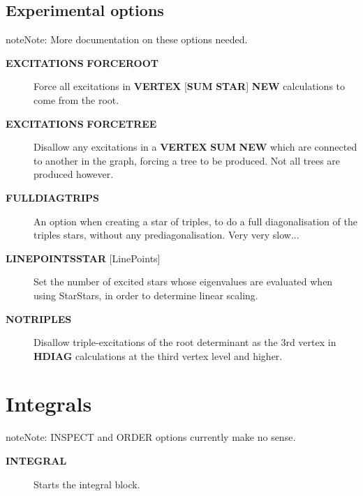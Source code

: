 \documentclass[openany,a4paper,10pt,english]{manual}
\begin{document}
\subsection{Experimental options}

\begin{notice}{note}{Note:}
More documentation on these options needed.
\end{notice}
\begin{description}
\item[\textbf{EXCITATIONS} \textbf{FORCEROOT}] \leavevmode
Force all excitations in \textbf{VERTEX} {[}\textbf{SUM} \textbf{STAR}{]} \textbf{NEW}
calculations to come from the root.

\item[\textbf{EXCITATIONS} \textbf{FORCETREE}] \leavevmode
Disallow any excitations in a \textbf{VERTEX} \textbf{SUM} \textbf{NEW} which are
connected to another in the graph, forcing a tree to be produced.
Not all trees are produced however.

\item[\textbf{FULLDIAGTRIPS}] \leavevmode
An option when creating a star of triples, to do a
full diagonalisation of the triples stars, without any
prediagonalisation. Very very slow...

\item[\textbf{LINEPOINTSSTAR} {[}LinePoints{]}] \leavevmode
Set the number of excited stars whose eigenvalues are evaluated when
using StarStars, in order to determine linear scaling.

\item[\textbf{NOTRIPLES}] \leavevmode
Disallow triple-excitations of the root determinant as the 3rd vertex
in \textbf{HDIAG} calculations at the third vertex level and higher.

\end{description}

\resetcurrentobjects
\hypertarget{--doc-input/integrals}{}

\hypertarget{input-integrals}{}\section{Integrals}

\begin{notice}{note}{Note:}
INSPECT and ORDER options currently make no sense.
\end{notice}
\begin{description}
\item[\textbf{INTEGRAL}] \leavevmode
Starts the integral block.

\end{description}
\end{document}
